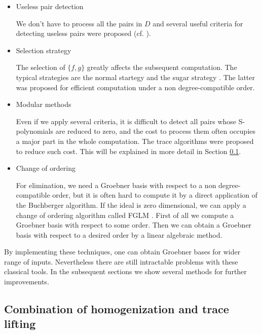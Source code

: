 \documentclass[runningheads]{cl2emult}
\begin{document}
\begin{itemize}
\item Useless pair detection

We don't have to process all the pairs in $D$ and several useful
criteria for detecting useless pairs were proposed (cf. \cite{noro:BW}).

\item Selection strategy

The selection of $\{f,g\}$ greatly affects the subsequent computation.
The typical strategies are the normal startegy 
and the sugar strategy \cite{noro:SUGAR}.
The latter was proposed for efficient computation under a non 
degree-compatible order.

\item Modular methods

Even if we apply several criteria, it is difficult to detect all pairs
whose S-polynomials are reduced to zero, and the cost to process them
often occupies a major part in the whole computation. The trace
algorithms \cite{noro:TRAV} were proposed to reduce such cost. This
will be explained in more detail in Section \ref{sec:gbhomo}.

\item Change of ordering

For elimination, we need a Groebner basis with respect to a non
degree-compatible order, but it is often hard to compute it by a
direct application of the Buchberger algorithm. If the ideal is zero
dimensional, we can apply a change of ordering algorithm called FGLM
\cite{noro:FGLM}. First of all we compute a Groebner basis with
respect to some order. Then we can obtain a Groebner basis with respect
to a desired order by a linear algebraic method.

\end{itemize}
By implementing these techniques, one can obtain Groebner bases for
wider range of inputs. Nevertheless there are still intractable
problems with these classical tools. In the subsequent sections
we show several methods for further improvements.

\subsection{Combination of homogenization and trace lifting}
\label{sec:gbhomo}
\end{document}

